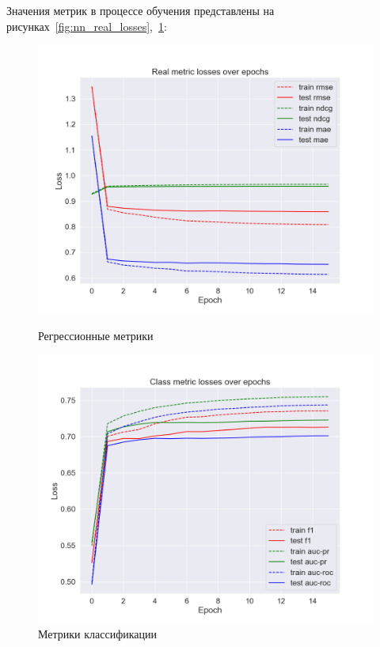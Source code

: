 Значения метрик в процессе обучения представлены на рисунках~\ref{fig:nn_real_losses},~\ref{fig:nn_class_losses}:

\begin{figure}[h!]
\centering
\begin{minipage}{.5\textwidth}
\centering
\includegraphics[width=1.0\linewidth]{images/neural_net/real_losses}
\caption{Регрессионные метрики}
\label{fig:nn_real_losses}
\end{minipage}%
\begin{minipage}{.5\textwidth}
\centering
\includegraphics[width=1.0\linewidth]{images/neural_net/class_losses}
\caption{Метрики классификации}
\label{fig:nn_class_losses}
\end{minipage}
\end{figure}

